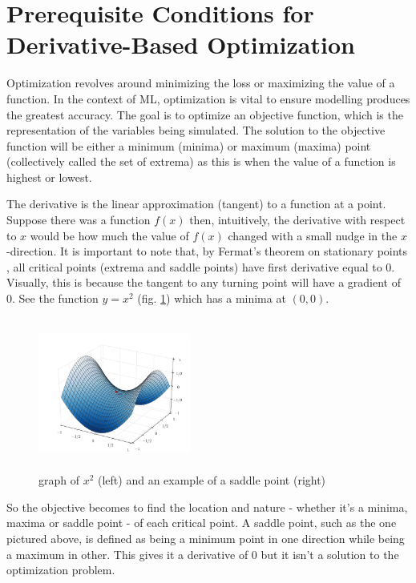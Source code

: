 \documentclass[10pt,a4paper]{report}
\begin{document}
		\section{Prerequisite Conditions for Derivative-Based Optimization}
			Optimization revolves around minimizing the loss or maximizing the value of a function. In the
			context of ML, optimization is vital to ensure modelling produces the greatest accuracy.
			The goal is to optimize an objective function, which is the
			representation of the variables being simulated. The solution to the objective function will be
			either a minimum (minima) or maximum (maxima) point (collectively called the set of extrema) as
			this is when the value of a function is highest or lowest. \par
			The derivative is the linear approximation (tangent) to a function at a point. Suppose there was a
			function $f(x)$ then, intuitively, the derivative with respect to $x$ would be how much the value of $f(x)$
			changed with a small nudge in the $x$-direction. It is important to note that, by Fermat's theorem on stationary points
			\autocite{StationaryPoints}, all critical points (extrema and saddle points) have first derivative equal to 0. Visually, this
			is because the tangent to any turning point will have a gradient of 0. See the function $y = x^2$ (fig. \ref{fig:extrema}) which has a minima at $(0,0)$. \par
			\begin{figure}[h]
				\centering
				\includegraphics[width=5cm,height=5cm,keepaspectratio]{saddle-point.png}
				\caption{graph of $x^2$ (left) and an example of a saddle point (right)}
				\label{fig:extrema}
			\end{figure}
			So the objective becomes to find the location and nature - whether it's a minima, maxima or saddle point - of each critical point. A saddle point, such as the one pictured above, is defined as
			being a minimum point in one direction while being a maximum in other. This gives it a derivative of 0 but it isn't a solution to the optimization problem.
\end{document}
